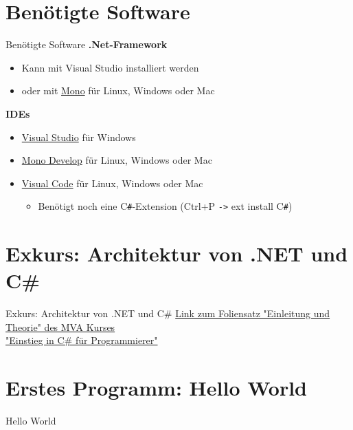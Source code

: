 \section{Benötigte Software}
\begin{frame}{Benötigte Software}
	\textbf{.Net-Framework}
	\begin{itemize}
		\item Kann mit Visual Studio installiert werden
		\item oder mit \href{http://www.mono-project.com/}{Mono} für Linux, Windows oder Mac
	\end{itemize}
	\textbf{IDEs}
	\begin{itemize}
		\item \href{https://www.visualstudio.com/}{Visual Studio} für Windows
		\item \href{http://www.monodevelop.com/}{Mono Develop} für Linux, Windows oder Mac
		\item \href{https://www.visualstudio.com/de-de/products/code-vs.aspx}{Visual Code} für Linux, Windows oder Mac
		\begin{itemize}
			\item Benötigt noch eine C\texttt{\#}-Extension (Ctrl+P \texttt{->} ext install C\texttt{\#})
		\end{itemize}
	\end{itemize}
\end{frame}

\section[Exkurs: \newline Architektur von .NET und C\#]{Exkurs:  Architektur von .NET und C\#}
\begin{frame}{Exkurs: Architektur von .NET und C\#}
	\centering
	\href{https://mva.microsoft.com/de-de/training-courses/einstieg-in-c-fr-programmierer-8826?l=MoyWcix2_1304984382}{Link zum Foliensatz "Einleitung und Theorie" des MVA Kurses \\"Einstieg in C\# für Programmierer"}
\end{frame} 

\section{Erstes Programm: Hello World}
\begin{frame}{Hello World}
       
\end{frame} 

